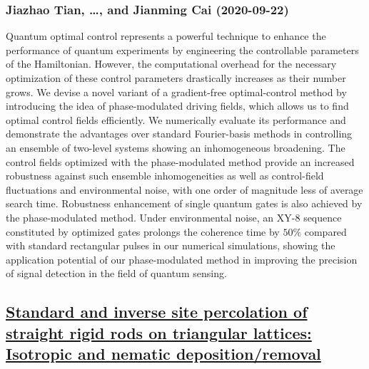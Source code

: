 {\subsubsection*{Jiazhao Tian, \dots, and Jianming Cai (2020-09-22)}
Quantum optimal control represents a powerful technique to enhance the
performance of quantum experiments by engineering the controllable parameters
of the Hamiltonian. However, the computational overhead for the necessary
optimization of these control parameters drastically increases as their number
grows. We devise a novel variant of a gradient-free optimal-control method by
introducing the idea of phase-modulated driving fields, which allows us to find
optimal control fields efficiently. We numerically evaluate its performance and
demonstrate the advantages over standard Fourier-basis methods in controlling
an ensemble of two-level systems showing an inhomogeneous broadening. The
control fields optimized with the phase-modulated method provide an increased
robustness against such ensemble inhomogeneities as well as control-field
fluctuations and environmental noise, with one order of magnitude less of
average search time. Robustness enhancement of single quantum gates is also
achieved by the phase-modulated method. Under environmental noise, an XY-8
sequence constituted by optimized gates prolongs the coherence time by $50\%$
compared with standard rectangular pulses in our numerical simulations, showing
the application potential of our phase-modulated method in improving the
precision of signal detection in the field of quantum sensing.

\subsection*{\href{http://arxiv.org/abs/2009.10234v1}{Standard and inverse site percolation of straight rigid rods on  triangular lattices: Isotropic and nematic deposition/removal}}
}
